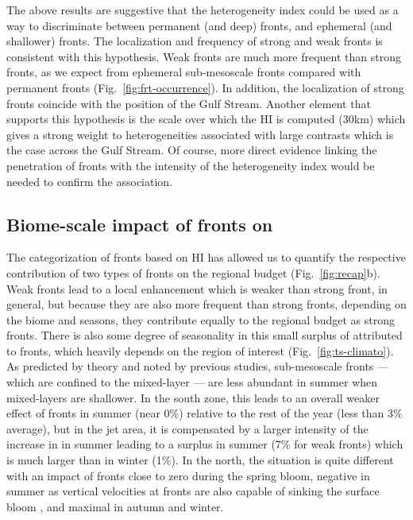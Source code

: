 The above results are suggestive that the heterogeneity index could be used as a way to discriminate between permanent (and deep) fronts, and ephemeral (and shallower) fronts.
The localization and frequency of strong and weak fronts is consistent with this hypothesis.
Weak fronts are much more frequent than strong fronts, as we expect from ephemeral sub-mesoscale fronts compared with permanent fronts (Fig.~\ref{fig:frt-occurrence}).
In addition, the localization of strong fronts coincide with the position of the Gulf Stream.
Another element that supports this hypothesis is the scale over which the HI is computed (30km) which gives a strong weight to  heterogeneities associated with large contrasts which is the case across the Gulf Stream.
Of course, more direct evidence linking the penetration of fronts with the intensity of the heterogeneity index would be needed to confirm the association.

\subsection{Biome-scale impact of fronts on }

The categorization of fronts based on HI has allowed us to quantify the respective contribution of two types of fronts on the regional  budget (Fig.~\ref{fig:recap}b).
Weak fronts lead to a local  enhancement which is weaker than strong front, in general, but because they are also more frequent than strong fronts, depending on the biome and seasons, they contribute equally to the regional  budget as strong fronts.
There is also some degree of seasonality in this small surplus of  attributed to fronts, which heavily depends on the region of interest (Fig.~\ref{fig:ts-climato}).
As predicted by theory and noted by previous studies, sub-mesoscale fronts --- which are confined to the mixed-layer --- are less abundant in summer when mixed-layers are shallower.
In the south zone, this leads to an overall weaker effect of fronts in summer (near 0\%) relative to the rest of the year (less than 3\% average), but in the jet area, it is compensated by a larger intensity of the increase in  in summer leading to a  surplus in summer (7\% for weak fronts) which is much larger than in winter (1\%).
In the north, the situation is quite different with an impact of fronts close to zero during the spring bloom, negative in summer as vertical velocities at fronts are also capable of sinking the surface bloom \citep{levy_2018}, and maximal in autumn and winter.

